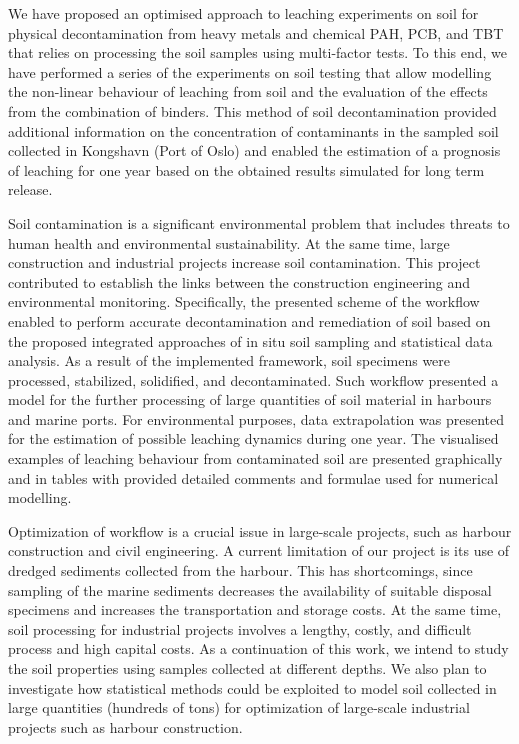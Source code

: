 \documentclass[algorithms,article,accept,pdftex,moreauthors]{Definitions/mdpi}
\begin{document}
We have proposed an {optimised }approach to leaching experiments on soil for physical decontamination from heavy metals and chemical PAH, PCB, and TBT that relies on {processing} the soil samples {using multi-factor} tests. To this end, we have {performed a series of the experiments on} soil testing that allow modelling {the }non-linear behaviour of leaching from soil and {the evaluation of the effects from} the combination of binders. {This method of soil decontamination provided additional }information on the concentration of contaminants {in the sampled soil collected in Kongshavn (Port of Oslo) and enabled the estimation of a prognosis of leaching for one year based on the obtained results simulated for long term release.}

Soil contamination is a significant environmental problem that includes threats to human health and environmental sustainability. At the same time, large construction {and industrial }projects increase {soil} contamination{. This} project contributed to establish the links between the construction engineering and environmental monitoring. {Specifically, }the presented scheme of the workflow enabled to perform accurate decontamination and remediation of soil based on the proposed integrated approaches of {in situ} soil sampling and statistical data analysis. As a result of the implemented framework, soil specimens were processed, stabilized, solidified, and decontaminated. Such workflow {presented} a model for the further processing of large quantities of soil material in harbours and marine ports. {For} environmental purposes, {data} extrapolation was presented for the estimation of possible {leaching }dynamics during one year{. }The visualised examples of {leaching} behaviour {from contaminated soil} are presented {graphically} and {in }tables with provided detailed comments and formulae used for numerical modelling.

Optimization of workflow is a crucial issue in {large-scale} projects, {such }as harbour construction and civil engineering{. }A current limitation of our project is its use of dredged sediments collected from the harbour{. This} has shortcomings, since sampling {of the }marine sediments decreases the availability of suitable disposal specimens and increases {the }transportation and storage costs{. At the same time, }soil processing for industrial projects involves a lengthy, costly, and difficult process and high capital costs. {As} a continuation of this work, we intend to study the soil properties {using samples }collected at different depths. We also plan to investigate how statistical methods could be exploited to model soil collected in large quantities (hundreds of tons) for optimization of large-scale industrial projects such as harbour construction. 
\end{document}
